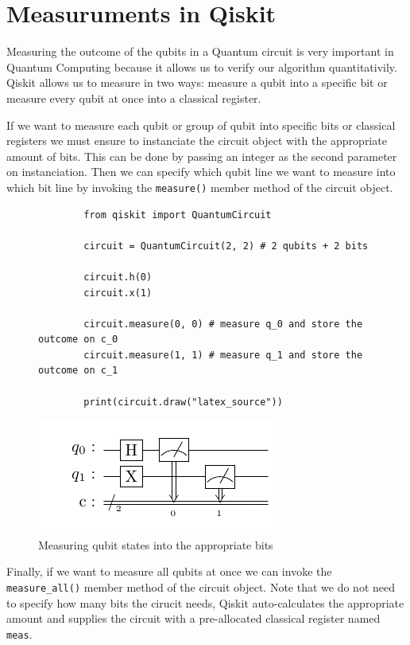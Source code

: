 \section{Measuruments in Qiskit}

Measuring the outcome of the qubits in a Quantum circuit is very important in Quantum Computing because it allows us to verify our
algorithm quantitativily. Qiskit allows us to measure in two ways: measure a qubit into a specific bit or measure every qubit at once
into a classical register.

If we want to measure each qubit or group of qubit into specific bits or classical registers we must ensure to instanciate the circuit
object with the appropriate amount of bits. This can be done by passing an integer as the second parameter on instanciation. Then
we can specify which qubit line we want to measure into which bit line by invoking the \verb|measure()| member method of the circuit
object.

\begin{figure}[ht]
    \centering
    \begin{verbatim}
        from qiskit import QuantumCircuit

        circuit = QuantumCircuit(2, 2) # 2 qubits + 2 bits
        
        circuit.h(0)
        circuit.x(1)

        circuit.measure(0, 0) # measure q_0 and store the outcome on c_0
        circuit.measure(1, 1) # measure q_1 and store the outcome on c_1

        print(circuit.draw("latex_source"))
    \end{verbatim}
    \centering
    \includegraphics{images/4_Qiskit/example_meas_q2b_1.pdf}
    \caption{Measuring qubit states into the appropriate bits}
\end{figure}

Finally, if we want to measure all qubits at once we can invoke the \verb|measure_all()| member method of the circuit object.
Note that we do not need to specify how many bits the cirucit needs, Qiskit auto-calculates the appropriate amount and
supplies the circuit with a pre-allocated classical register named \verb|meas|.

